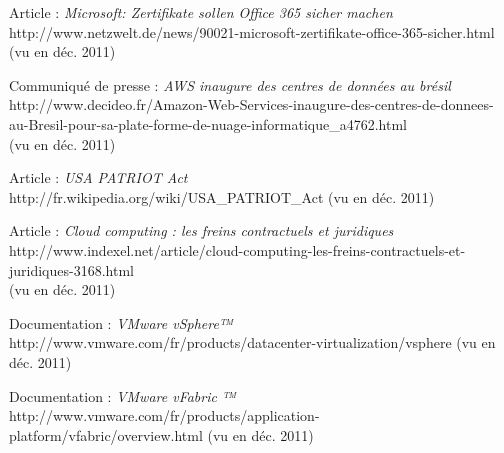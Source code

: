 \documentclass[a4paper,12pt]{report}
\begin{document}
\begin{onehalfspace}
\begin{flushleft}
\begin{thebibliography}{9}
	 Article : \textit{Microsoft: Zertifikate sollen Office 365 sicher machen} \\
http://www.netzwelt.de/news/90021-microsoft-zertifikate-office-365-sicher.html \\(vu en déc. 2011)

	 Communiqué de presse : \textit{AWS inaugure des centres de données au brésil} \\
http://www.decideo.fr/Amazon-Web-Services-inaugure-des-centres-de-donnees-au-Bresil-pour-sa-plate-forme-de-nuage-informatique\_a4762.html \\(vu en déc. 2011)

	 Article : \textit{USA PATRIOT Act} \\
http://fr.wikipedia.org/wiki/USA\_PATRIOT\_Act (vu en déc. 2011)

	 Article : \textit{Cloud computing : les freins contractuels et juridiques} \\
http://www.indexel.net/article/cloud-computing-les-freins-contractuels-et-juridiques-3168.html \\ (vu en déc. 2011)

	 Documentation : \textit{VMware vSphere™} \\
http://www.vmware.com/fr/products/datacenter-virtualization/vsphere (vu en déc. 2011)

	 Documentation : \textit{VMware vFabric ™} \\
http://www.vmware.com/fr/products/application-platform/vfabric/overview.html (vu en déc. 2011)
	\end{thebibliography}
\end{flushleft}

	\renewcommand*\glossaryname{Glossaire}
	\glsaddall
	\printglossaries

	\tableofcontents

	\end{onehalfspace}
\end{document}
